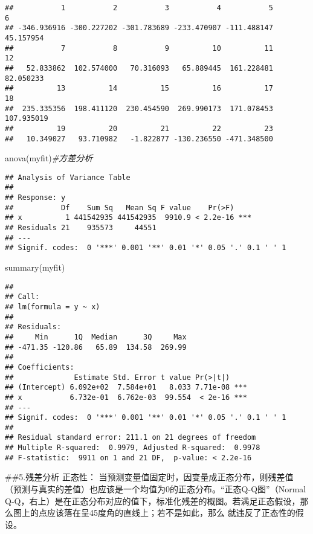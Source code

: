 \documentclass[
]{article}
\newenvironment{Shaded}{\begin{snugshade}}{\end{snugshade}}
\newcommand{\CommentTok}[1]{\textcolor[rgb]{0.56,0.35,0.01}{\textit{#1}}}
\newcommand{\FunctionTok}[1]{\textcolor[rgb]{0.00,0.00,0.00}{#1}}
\newcommand{\NormalTok}[1]{#1}
\begin{document}
\begin{verbatim}
##           1           2           3           4           5           6 
## -346.936916 -300.227202 -301.783689 -233.470907 -111.488147   45.157954 
##           7           8           9          10          11          12 
##   52.833862  102.574000   70.316093   65.889445  161.228481   82.050233 
##          13          14          15          16          17          18 
##  235.335356  198.411120  230.454590  269.990173  171.078453  107.935019 
##          19          20          21          22          23 
##   10.349027   93.710982   -1.822877 -130.236550 -471.348500
\end{verbatim}

\begin{Shaded}
\begin{Highlighting}[]
\FunctionTok{anova}\NormalTok{(myfit)}\CommentTok{\#方差分析}
\end{Highlighting}
\end{Shaded}

\begin{verbatim}
## Analysis of Variance Table
## 
## Response: y
##           Df    Sum Sq   Mean Sq F value    Pr(>F)    
## x          1 441542935 441542935  9910.9 < 2.2e-16 ***
## Residuals 21    935573     44551                      
## ---
## Signif. codes:  0 '***' 0.001 '**' 0.01 '*' 0.05 '.' 0.1 ' ' 1
\end{verbatim}

\begin{Shaded}
\begin{Highlighting}[]
\FunctionTok{summary}\NormalTok{(myfit)}
\end{Highlighting}
\end{Shaded}

\begin{verbatim}
## 
## Call:
## lm(formula = y ~ x)
## 
## Residuals:
##     Min      1Q  Median      3Q     Max 
## -471.35 -120.86   65.89  134.58  269.99 
## 
## Coefficients:
##              Estimate Std. Error t value Pr(>|t|)    
## (Intercept) 6.092e+02  7.584e+01   8.033 7.71e-08 ***
## x           6.732e-01  6.762e-03  99.554  < 2e-16 ***
## ---
## Signif. codes:  0 '***' 0.001 '**' 0.01 '*' 0.05 '.' 0.1 ' ' 1
## 
## Residual standard error: 211.1 on 21 degrees of freedom
## Multiple R-squared:  0.9979, Adjusted R-squared:  0.9978 
## F-statistic:  9911 on 1 and 21 DF,  p-value: < 2.2e-16
\end{verbatim}

\#\#5.残差分析 正态性：
当预测变量值固定时，因变量成正态分布，则残差值（预测与真实的差值）也应该是一个均值为0的正态分布。``正态Q-Q图''（Normal
Q-Q，右上）是在正态分布对应的值下，标准化残差的概图。若满足正态假设，那么图上的点应该落在呈45度角的直线上；若不是如此，那么
就违反了正态性的假设。
\end{document}
